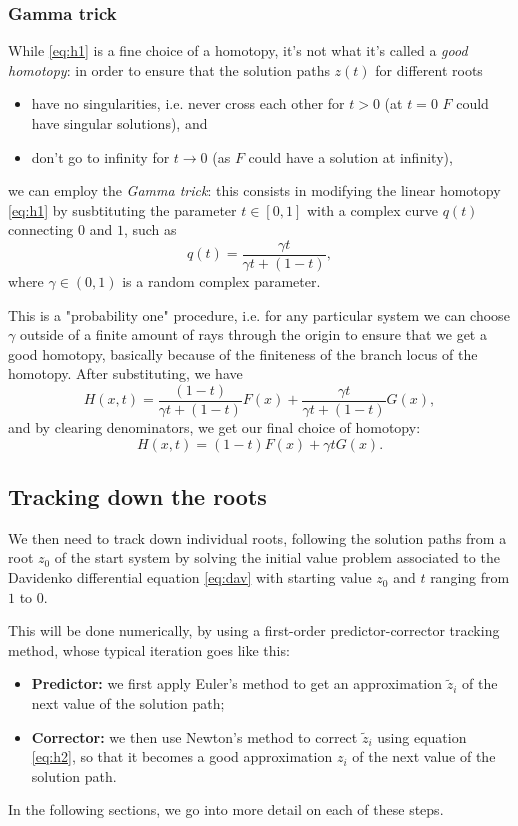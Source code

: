 \documentclass[a4paper]{article}
\theoremstyle{definition}
\theoremstyle{definition}
\theoremstyle{remark}
\theoremstyle{definition}
\begin{document}
\subsubsection{Gamma trick}
While \eqref{eq:h1} is a fine choice of a homotopy, it's not what it's called a \textit{good homotopy}: in order to ensure that the solution paths $z(t)$ for different roots
\begin{itemize}
    \item have no singularities, i.e. never cross each other for $t>0$ (at $t=0$ $F$ could have singular solutions), and
    \item don't go to infinity for $t\to 0$ (as $F$ could have a solution at infinity),
\end{itemize}
we can employ the \textit{Gamma trick}: this consists in modifying the linear homotopy
\eqref{eq:h1} by susbtituting the parameter $t\in[0,1]$ with a complex curve $q(t)$ connecting $0$ and $1$, such as
$$ q(t)=\frac{\gamma t}{\gamma t+(1-t)} ,$$
where $\gamma\in(0,1)$ is a random complex parameter.

This is a "probability one" procedure, i.e. for any particular system we can choose $\gamma$ outside of a finite amount of rays through
the origin to ensure that we get a good homotopy, basically because of the finiteness of the branch locus of the homotopy.
After substituting, we have
$$ H(x,t)=\frac{(1-t)}{\gamma t+(1-t)}F(x)+\frac{\gamma t}{\gamma t+(1-t)}G(x) ,$$
and by clearing denominators, we get our final choice of homotopy:
\begin{equation}\label{eq:h3} H(x,t)=(1-t)F(x)+\gamma tG(x) .\end{equation}
\subsection{Tracking down the roots}
We then need to track down individual roots, following the solution paths from
a root $z_0$ of the start system by solving the initial value problem associated to the Davidenko differential equation \eqref{eq:dav} with starting value $z_0$ and
$t$ ranging from $1$ to $0$.

This will be done numerically, by using a first-order predictor-corrector tracking method, whose typical iteration goes like this:
\begin{itemize}
    \item \textbf{Predictor:} we first apply Euler's method to get an approximation $\widetilde{z}_i$ of the next value of the solution path;
    \item \textbf{Corrector:} we then use Newton's method to correct $\widetilde{z}_i$ using equation \eqref{eq:h2}, so that it becomes a good approximation $z_i$ of the next value of the solution path.
\end{itemize}
In the following sections, we go into more detail on each of these steps.
\end{document}
